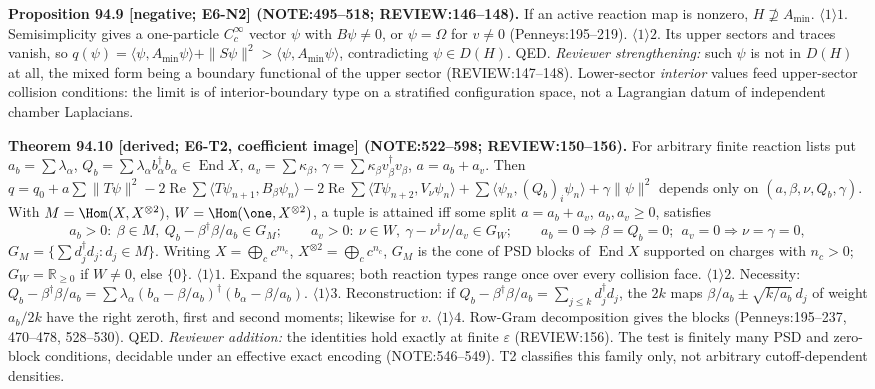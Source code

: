 \textbf{Proposition 94.9 [negative; E6-N2] (NOTE:495--518; REVIEW:146--148).}  If an active reaction map is nonzero,
\(H\not\supseteq A_{\min}\).  \(\langle1\rangle1\). Semisimplicity gives a one-particle \(C_c^\infty\) vector \(\psi\) with \(B\psi\neq0\), or
\(\psi=\Omega\) for \(v\neq0\) (Penneys:195--219).  \(\langle1\rangle2\). Its upper sectors and traces vanish, so
\(q(\psi)=\langle\psi,A_{\min}\psi\rangle+\|S\psi\|^2>\langle\psi,A_{\min}\psi\rangle\), contradicting \(\psi\in D(H)\).  QED.
\emph{Reviewer strengthening:} such \(\psi\) is not in \(D(H)\) at all, the mixed form being a boundary functional of the
upper sector (REVIEW:147--148).  Lower-sector \emph{interior} values feed upper-sector collision conditions: the limit is
of interior-boundary type on a stratified configuration space, not a Lagrangian datum of independent chamber Laplacians.

\textbf{Theorem 94.10 [derived; E6-T2, coefficient image] (NOTE:522--598; REVIEW:150--156).}  For arbitrary finite
reaction lists put \(a_b=\sum\lambda_\alpha\), \(Q_b=\sum\lambda_\alpha b_\alpha^\dagger b_\alpha\in\operatorname{End}X\), \(a_v=\sum\kappa_\beta\),
\(\gamma=\sum\kappa_\beta v_\beta^\dagger v_\beta\), \(a=a_b+a_v\).  Then
\(q=q_0+a\sum\|T\psi\|^2-2\operatorname{Re}\sum\langle T\psi_{n+1},B_\beta\psi_n\rangle-2\operatorname{Re}\sum\langle T\psi_{n+2},V_\nu\psi_n\rangle
+\sum\langle\psi_n,(Q_b)_i\psi_n\rangle+\gamma\|\psi\|^2\) depends only on \((a,\beta,\nu,Q_b,\gamma)\).  With \(M=\Hom(X,X^{\otimes2})\),
\(W=\Hom(\one,X^{\otimes2})\), a tuple is attained iff some split \(a=a_b+a_v\), \(a_b,a_v\ge0\), satisfies
\[
  a_b>0:\ \beta\in M,\ Q_b-\beta^\dagger\beta/a_b\in G_M;\qquad a_v>0:\ \nu\in W,\ \gamma-\nu^\dagger\nu/a_v\in G_W;\qquad
  a_b=0\Rightarrow\beta=Q_b=0;\ \ a_v=0\Rightarrow\nu=\gamma=0,
\]
\(G_M=\{\sum d_j^\dagger d_j:d_j\in M\}\).  Writing \(X=\bigoplus_cc^{m_c}\), \(X^{\otimes2}=\bigoplus_cc^{n_c}\), \(G_M\) is the cone of PSD blocks of
\(\operatorname{End}X\) supported on charges with \(n_c>0\); \(G_W=\mathbb R_{\ge0}\) if \(W\neq0\), else \(\{0\}\).
\(\langle1\rangle1\). Expand the squares; both reaction types range once over every collision face.  \(\langle1\rangle2\).
Necessity: \(Q_b-\beta^\dagger\beta/a_b=\sum\lambda_\alpha(b_\alpha-\beta/a_b)^\dagger(b_\alpha-\beta/a_b)\).  \(\langle1\rangle3\). Reconstruction: if
\(Q_b-\beta^\dagger\beta/a_b=\sum_{j\le k}d_j^\dagger d_j\), the \(2k\) maps \(\beta/a_b\pm\sqrt{k/a_b}\,d_j\) of weight \(a_b/2k\) have the right
zeroth, first and second moments; likewise for \(v\).  \(\langle1\rangle4\). Row-Gram decomposition gives the blocks
(Penneys:195--237, 470--478, 528--530).  QED.  \emph{Reviewer addition:} the identities hold exactly at finite \(\varepsilon\)
(REVIEW:156).  The test is finitely many PSD and zero-block conditions, decidable under an effective exact encoding
(NOTE:546--549).  T2 classifies this family only, not arbitrary cutoff-dependent densities.

